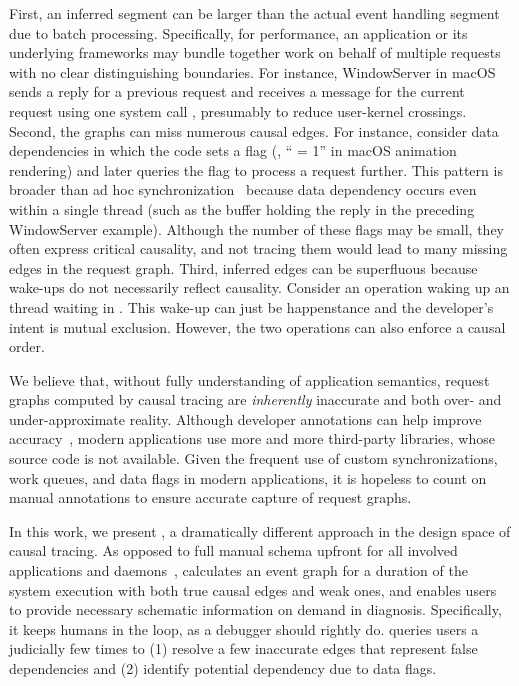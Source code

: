 First, an inferred segment can be larger than the actual event handling segment
due to batch processing. Specifically, for performance, an application or its
underlying frameworks may bundle together work on behalf of multiple requests
with no clear distinguishing boundaries. For instance, WindowServer in macOS
sends a reply for a previous request and receives a message for the current
request using one system call , presumably to
reduce user-kernel crossings. Second, the graphs can miss numerous causal
edges. For instance, consider data dependencies in which the code sets a flag
(\eg, `` = 1'' in macOS animation rendering) and later
queries the flag to process a request further. This pattern is broader than
ad hoc synchronization~\cite{xiong2010ad} because data dependency occurs
even within a single thread (such as the buffer holding the reply in the
preceding WindowServer example). Although the number of these flags may be
small, they often express critical causality, and not tracing them would lead
to many missing edges in the request graph. Third, inferred edges can be
superfluous because wake-ups do not necessarily reflect
causality. Consider an  operation waking up an thread waiting
in . This wake-up can just be happenstance and the developer's
intent is mutual exclusion. However, the two operations can also enforce a
causal order.

We believe that, without fully understanding of application semantics, request
graphs computed by causal tracing are \emph{inherently} inaccurate and both
over- and under-approximate reality. Although developer annotations can help
improve accuracy~\cite{reynolds2006pip, fonseca2007x}, modern applications use
more and more third-party libraries, whose source code is not available. Given
the frequent use of custom synchronizations, work queues, and data flags in
modern applications, it is hopeless to count on manual annotations to ensure
accurate capture of request graphs.

In this work, we present \xxx, a dramatically different approach in the design
space of causal tracing. As opposed to full manual schema upfront for
all involved applications and daemons~\cite{barham2004using, reynolds2006pip,
fonseca2007x}, \xxx calculates an event graph for a duration of the system
execution with both true causal edges and weak ones, and enables users to
provide necessary schematic information on demand in diagnosis. Specifically, it
keeps humans in the loop, as a debugger should rightly do. \xxx queries users a
judicially few times to (1) resolve a few inaccurate edges that represent false
dependencies and (2) identify potential dependency due to data flags.

